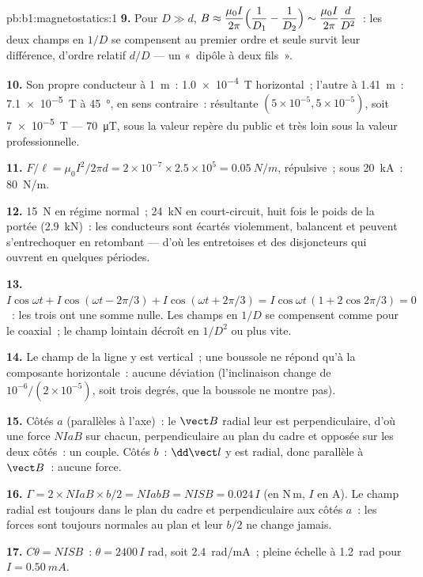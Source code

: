 \begin{solution}{pb:b1:magnetostatics:1}
\textbf{9.} Pour $D \gg d$, $B \approx \dfrac{\mu_0I}{2\pi}\Bigl(\dfrac1{D_1} - \dfrac1{D_2}\Bigr)
\sim \dfrac{\mu_0I}{2\pi}\dfrac{d}{D^2}$~: les deux champs en $1/D$ se compensent
au premier ordre et seule survit leur différence, d'ordre relatif $d/D$ --- un
«~dipôle à deux fils~».

\textbf{10.} Son propre conducteur à \qty{1}{m}~: \qty{1.0e-4}{T} horizontal~; l'autre
à \qty{1.41}{m}~: \qty{7.1e-5}{T} à \qty{45}{\degree}, en sens contraire~: résultante
$(5 \times 10^{-5}, 5 \times 10^{-5})$, soit \qty{7e-5}{T} --- \qty{70}{\micro T}, sous la
valeur repère du public et très loin sous la valeur professionnelle.

\textbf{11.} $F/\ell = \mu_0I^2/2\pi d = 2 \times 10^{-7} \times 2.5 \times 10^5 =
\qty{0.05}{N/m}$, répulsive~; sous \qty{20}{kA}~: \qty{80}{N/m}.

\textbf{12.} \qty{15}{N} en régime normal~; \qty{24}{kN} en court-circuit, huit fois
le poids de la portée (\qty{2.9}{kN})~: les conducteurs sont écartés violemment,
balancent et peuvent s'entrechoquer en retombant --- d'où les entretoises et
des disjoncteurs qui ouvrent en quelques périodes.

\textbf{13.} $I\cos\omega t + I\cos(\omega t - 2\pi/3) + I\cos(\omega t + 2\pi/3) =
I\cos\omega t\,(1 + 2\cos2\pi/3) = 0$~: les trois  ont une
somme nulle. Les champs en $1/D$ se compensent comme pour le coaxial~; le champ
lointain décroît en $1/D^2$ ou plus vite.

\textbf{14.} Le champ de la ligne y est vertical~; une boussole ne répond qu'à
la composante horizontale~: aucune déviation (l'inclinaison change de
$10^{-6}/(2 \times 10^{-5})$, soit trois degrés, que la boussole ne montre pas).

\textbf{15.} Côtés $a$ (parallèles à l'axe)~: le $\vect B$ radial leur est
perpendiculaire, d'où une force $NIaB$ sur chacun, perpendiculaire au plan du
cadre et opposée sur les deux côtés~: un couple. Côtés $b$~: $\dd\vect l$ y est
radial, donc parallèle à $\vect B$~: aucune force.

\textbf{16.} $\Gamma = 2 \times NIaB \times b/2 = NIabB = NISB = 0.024\,I$ (en N\,m, $I$
en A). Le champ radial est toujours dans le plan du cadre et perpendiculaire
aux côtés $a$~: les forces sont toujours normales au plan et leur  $b/2$ ne change jamais.

\textbf{17.} $C\theta = NISB$~: $\theta = 2400\,I$ rad, soit \qty{2.4}{rad/mA}~; pleine
échelle à \qty{1.2}{rad} pour $I = \qty{0.50}{mA}$.


\end{solution}
